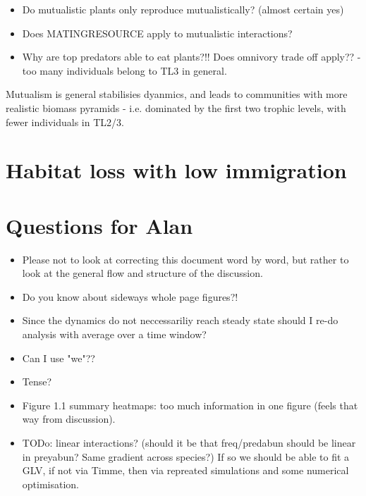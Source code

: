 \begin{itemize}
\begin{itemize}
	\item Do mutualistic plants only reproduce mutualistically? (almost certain yes)
	\item Does MATINGRESOURCE apply to mutualistic interactions?
	\item Why are top predators able to eat plants?!! Does omnivory trade off apply?? - too many individuals belong to TL3 in general.
\end{itemize}

Mutualism is general stabilisies dyanmics, and leads to communities with more realistic biomass pyramids - i.e. dominated by the first two trophic levels, with fewer individuals in TL2/3. 


\section{Habitat loss with low immigration}

\section{Questions for Alan}

\begin{itemize}
	\item Please not to look at correcting this document word by word, but rather to look at the general flow and structure of the discussion. 
	\item Do you know about sideways whole page figures?!
	\item Since the dynamics do not neccessariliy reach steady state should I re-do analysis with average over a time window?
	\item Can I use "we"??
	\item Tense?
	\item Figure 1.1 summary heatmaps: too much information in one figure (feels that way from discussion).
		
	\item TODo: linear interactions? (should it be that freq/predabun should be linear in preyabun? Same gradient across species?) If so we should be able to fit a GLV, if not via Timme, then via repreated simulations and some numerical optimisation.

\end{itemize}

\end{itemize}
